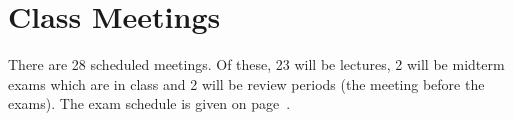 
\section*{Class Meetings}

There are 28 scheduled meetings. Of these, 23 will be lectures, 2 will be midterm exams which are in class and 2 will be review periods (the meeting before the exams). The exam schedule is given on page~\pageref{subsec:exam_schedule}. %